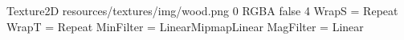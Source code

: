 Texture2D
resources/textures/img/wood.png
0
RGBA
false
4
WrapS = Repeat
WrapT = Repeat
MinFilter = LinearMipmapLinear
MagFilter = Linear
